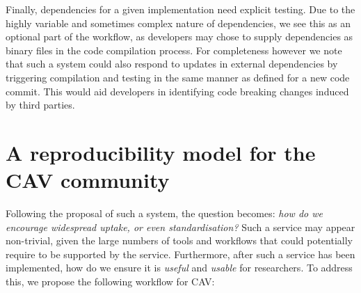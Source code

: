 \documentclass{llncs}
\begin{document}
Finally, dependencies for a given implementation need explicit
testing. Due to the highly variable and sometimes complex nature of
dependencies, we see this as an optional part of the workflow, as
developers may chose to supply dependencies as binary files in the
code compilation process. For completeness however we note that such a
system could also respond to updates in external dependencies by
triggering compilation and testing in the same manner as defined for a
new code commit. This would aid developers in identifying code
breaking changes induced by third parties.


\section{A reproducibility model for the CAV community}\label{rollout}

Following the proposal of such a system, the question becomes:
{\emph{how do we encourage widespread uptake, or even standardisation?}}
Such a service may appear non-trivial, given the large numbers of
tools and workflows
that could potentially require to be supported by the service. Furthermore,
after such a service has been implemented, how do we ensure it is
\emph{useful} and \emph{usable} for researchers. To address this, we
propose the following workflow for CAV:
\end{document}
